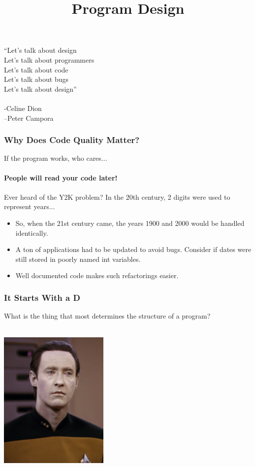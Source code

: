 \documentclass{beamer}
\title{Program Design}
\begin{document}
\begin{frame}
\titlepage
\end{frame}

\begin{frame}
  ``Let's talk about design\\
  Let's talk about programmers\\
  Let's talk about code\\
  Let's talk about bugs\\
  Let's talk about design''\\\\
  -Celine Dion\\
  --Peter Campora
\end{frame}

\begin{frame}
  \frametitle{Why Does Code Quality Matter?}
  \large If the program works, who cares...\\\\
  \pause
  \huge \textbf{People will read your code later!}\\\\
  \pause
  \large Ever heard of the Y2K problem? In the 20th century, 2 digits were used to represent years...
  \begin{itemize}
  \item<4->  So, when the 21st century came, the years 1900 and 2000 would be handled identically.
  \item<5-> A ton of applications had to be updated to avoid bugs. Consider if dates were still stored in poorly named int variables.
  \item<6-> Well documented code makes such refactorings easier.
  \end{itemize}
\end{frame}

\begin{frame}
  \frametitle{It Starts With a D}
  \large What is the thing that most determines the structure of a program?\\\\
  \pause
  \begin{center}
    \includegraphics[width=0.4\textwidth]{images/data.jpg}
  \end{center}
\end{frame}
\end{document}
